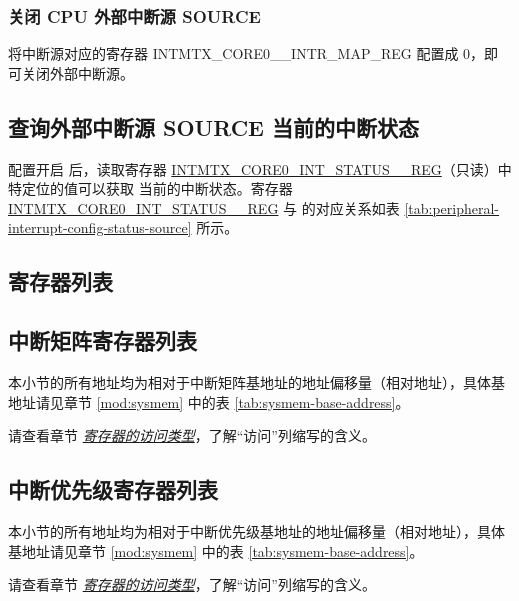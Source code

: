 \documentclass[main\_\_CN.tex]{subfiles}
\begin{document}
\subsubsection{关闭 CPU 外部中断源 SOURCE}

将中断源对应的寄存器 INTMTX\_CORE0\_\_INTR\_MAP\_REG 配置成 0，即可关闭外部中断源。



\subsection{查询外部中断源 SOURCE 当前的中断状态}

配置开启  后，读取寄存器 \hyperref[regdesc:INTMTXCORE0INTSTATUS0REG]{INTMTX\_CORE0\_INT\_STATUS\_\_REG}（只读）中特定位的值可以获取  当前的中断状态。寄存器 \hyperref[regdesc:INTMTXCORE0INTSTATUS0REG]{INTMTX\_CORE0\_INT\_STATUS\_\_REG} 与  的对应关系如表 \ref{tab:peripheral-interrupt-config-status-source} 所示。





\clearpage
\hypertarget{intmtrx-reg-summ}{}
\begin{landscape}
\section{寄存器列表}

\subsection{中断矩阵寄存器列表}
\label{sec:intmtrx-reg-summ}

本小节的所有地址均为相对于中断矩阵基地址的地址偏移量（相对地址），具体基地址请见章节 \ref{mod:sysmem} \textit{} 中的表 \ref{tab:sysmem-base-address}。

请查看章节 \hyperref[glossary-access-types]{\textit{寄存器的访问类型}}，了解“访问”列缩写的含义。



\subsection{中断优先级寄存器列表}
\label{sec:intpri-reg-summ}

本小节的所有地址均为相对于中断优先级基地址的地址偏移量（相对地址），具体基地址请见章节 \ref{mod:sysmem} \textit{} 中的表 \ref{tab:sysmem-base-address}。

请查看章节 \hyperref[glossary-access-types]{\textit{寄存器的访问类型}}，了解“访问”列缩写的含义。



\end{landscape}
\end{document}
